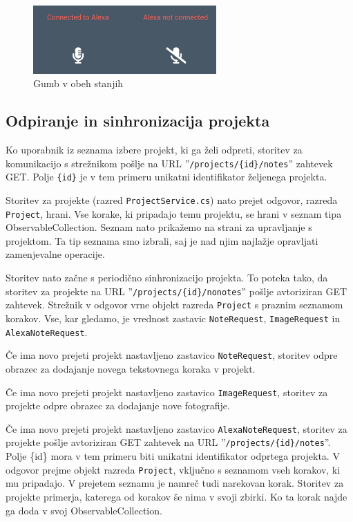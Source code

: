 \documentclass[a4paper, 12pt]{book}
\begin{document}
\begin{figure}[H]
\begin{center}
\includegraphics[width=7cm]{app_alexa_yesno}
\end{center}
	\caption{Gumb v obeh stanjih}
\label{app_alexa_yesno}
\end{figure}

\subsection{Odpiranje in sinhronizacija projekta}

Ko uporabnik iz seznama izbere projekt, ki ga želi odpreti, storitev za komunikacijo s strežnikom pošlje na URL ''\texttt{/projects/\{id\}/notes}'' zahtevek GET.
Polje \texttt{\{id\}} je v tem primeru unikatni identifikator željenega projekta.

Storitev za projekte (razred \texttt{ProjectService.cs}) nato prejet odgovor, razreda \texttt{Project}, hrani.
Vse korake, ki pripadajo temu projektu, se hrani v seznam tipa ObservableCollection.
Seznam nato prikažemo na strani za upravljanje s projektom.
Ta tip seznama smo izbrali, saj je nad njim najlažje opravljati zamenjevalne operacije.

Storitev nato začne s periodično sinhronizacijo projekta.
To poteka tako, da storitev za projekte na URL ''\texttt{/projects/\{id\}/nonotes}'' pošlje avtoriziran GET zahtevek.
Strežnik v odgovor vrne objekt razreda \texttt{Project} s praznim seznamom korakov.
Vse, kar gledamo, je vrednost zastavic \texttt{NoteRequest}, \texttt{ImageRequest} in \texttt{AlexaNoteRequest}.

Če ima novo prejeti projekt nastavljeno zastavico \texttt{NoteRequest}, storitev odpre obrazec za dodajanje novega tekstovnega koraka v projekt.

Če ima novo prejeti projekt nastavljeno zastavico \texttt{ImageRequest}, storitev za projekte odpre obrazec za dodajanje nove fotografije.

Če ima novo prejeti projekt nastavljeno zastavico \texttt{AlexaNoteRequest}, storitev za projekte pošlje avtoriziran GET zahtevek na URL ''\texttt{/projects/\{id\}/notes}''.
Polje \{id\} mora v tem primeru biti unikatni identifikator odprtega projekta.
V odgovor prejme objekt razreda \texttt{Project}, vključno s seznamom vseh korakov, ki mu pripadajo.
V prejetem seznamu je namreč tudi narekovan korak.
Storitev za projekte primerja, katerega od korakov še nima v svoji zbirki.
Ko ta korak najde ga doda v svoj ObservableCollection.
\end{document}
